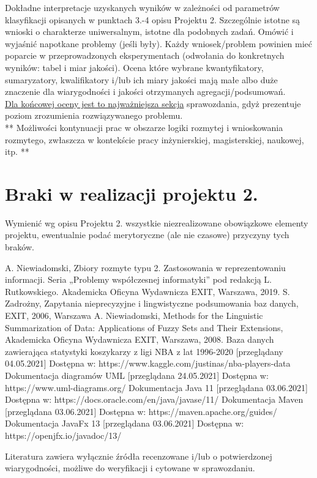 \documentclass{classrep}
\begin{document}
Dokładne interpretacje uzyskanych wyników w zależności od parametrów klasyfikacji
opisanych w punktach 3.-4 opisu Projektu 2. 
Szczególnie istotne są wnioski o charakterze uniwersalnym, istotne dla podobnych zadań. 
Omówić i wyjaśnić napotkane problemy (jeśli były). Każdy wniosek/problem powinien mieć poparcie
w przeprowadzonych eksperymentach (odwołania do konkretnych wyników: tabel i miar
jakości). Ocena które wybrane kwantyfikatory, sumaryzatory, kwalifikatory i/lub ich
miary jakości mają małe albo duże znaczenie dla wiarygodności i jakości otrzymanych
agregacji/podsumowań.  \\
\underline{Dla końcowej oceny jest to najważniejsza sekcja} sprawozdania, gdyż prezentuje poziom
zrozumienia rozwiązywanego problemu.\\

** Możliwości kontynuacji prac w obszarze logiki rozmytej i wnioskowania rozmytego, zwłaszcza w kontekście pracy inżynierskiej,
magisterskiej, naukowej, itp. **\\



\section{Braki w realizacji projektu 2.}
Wymienić wg opisu Projektu 2. wszystkie niezrealizowane obowiązkowe elementy projektu, ewentualnie
podać merytoryczne (ale nie czasowe) przyczyny tych braków. 


\begin{thebibliography}{99}
  A. Niewiadomski, Zbiory rozmyte typu 2. Zastosowania w reprezentowaniu informacji.  Seria „Problemy współczesnej informatyki” pod redakcją L. Rutkowskiego. Akademicka Oficyna Wydawnicza EXIT, Warszawa, 2019.
 S. Zadrożny, Zapytania nieprecyzyjne i lingwistyczne podsumowania baz danych, EXIT, 2006, Warszawa
 A. Niewiadomski, Methods for the Linguistic Summarization of Data: Applications of Fuzzy Sets and Their Extensions, Akademicka Oficyna Wydawnicza EXIT, Warszawa, 2008.
 Baza danych zawierająca statystyki koszykarzy z ligi NBA z lat 1996-2020 [przeglądany 04.05.2021] Dostępna w:
https://www.kaggle.com/justinas/nba-players-data
 Dokumentacja diagramów UML [przeglądana 24.05.2021] Dostępna w:
https://www.uml-diagrams.org/
 Dokumentacja Java 11 [przeglądana 03.06.2021] Dostępna w: https://docs.oracle.com/en/java/javase/11/
 Dokumentacja Maven [przeglądana 03.06.2021] Dostępna w: https://maven.apache.org/guides/
 Dokumentacja JavaFx 13 [przeglądana 03.06.2021] Dostępna w: https://openjfx.io/javadoc/13/
\end{thebibliography}

Literatura zawiera wyłącznie źródła recenzowane i/lub o potwierdzonej wiarygodności,
możliwe do weryfikacji i cytowane w sprawozdaniu. 
\end{document}
